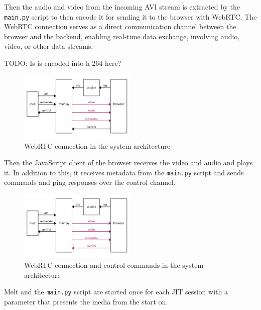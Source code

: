 \documentclass[../MasterThesis.tex]{subfiles}
\begin{document}
Then the audio and video from the incoming AVI stream is extracted by the \texttt{main.py} script to then encode it for sending it to the browser with WebRTC. The WebRTC connection serves as a direct communication channel between the browser and the backend, enabling real-time data exchange, involving audio, video, or other data streams. 

TODO: Is is encoded into h-264 here?

%

\begin{figure}[H]
	\centering
	\includegraphics[width=0.5\textwidth]{IM_wrtc.png}
	\caption{WebRTC connection in the system architecture}
\end{figure}

Then the JavaScript client of the browser receives the video and audio and plays it. In addition to this, it
receives metadata from the \texttt{main.py} script and sends commands and ping responses over the control channel.


\begin{figure}[H]
	\centering
	\includegraphics[width=0.5\textwidth]{IM_wrtc_control.png}
	\caption[WebRTC and control in the system architecture]{WebRTC connection and control commands in the system architecture}
\end{figure}

Melt and the \texttt{main.py} script are started once for each JIT session with a parameter that presents the media from the start on.
\end{document}

